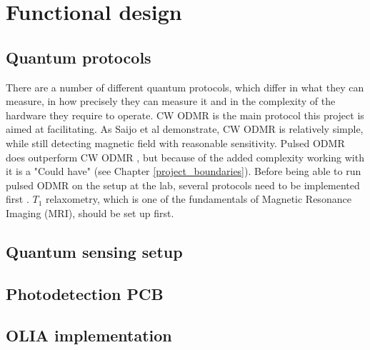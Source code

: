 \chapter{Functional design} \label{chap:func_design}
\section{Quantum protocols}
There are a number of different quantum protocols, which differ in what they can measure, in how precisely they can measure it and in the complexity of the hardware they require to operate. CW ODMR is the main protocol this project is aimed at facilitating. As Saijo et al \cite{saijo2018ac} demonstrate, CW ODMR is relatively simple, while still detecting magnetic field with reasonable sensitivity. Pulsed ODMR does outperform CW ODMR \cite{zhang2020high}, but because of the added complexity working with it is a "Could have" (see Chapter \ref{project_boundaries}). Before being able to run pulsed ODMR on the setup at the lab, several protocols need to be implemented first \cite{sewani2020coherent}. $T_1$ relaxometry, which is one of the fundamentals of Magnetic Resonance Imaging (MRI), should be set up first.

\section{Quantum sensing setup}
\section{Photodetection PCB}
\section{OLIA implementation}

